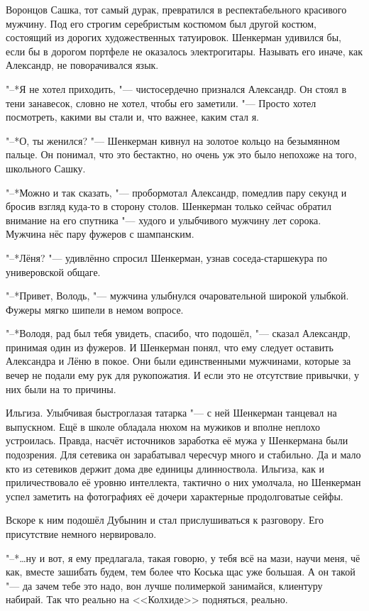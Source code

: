 Воронцов Сашка, тот самый дурак, превратился в респектабельного красивого мужчину.
Под его строгим серебристым костюмом был другой костюм, состоящий из дорогих художественных татуировок.
Шенкерман удивился бы, если бы в дорогом портфеле не оказалось электрогитары.
Называть его иначе, как Александр, не поворачивался язык.

"--*Я не хотел приходить, "--- чистосердечно признался Александр.
Он стоял в тени занавесок, словно не хотел, чтобы его заметили.
"--- Просто хотел посмотреть, какими вы стали и, что важнее, каким стал я.

"--*О, ты женился? "--- Шенкерман кивнул на золотое кольцо на безымянном пальце.
Он понимал, что это бестактно, но очень уж это было непохоже на того, школьного Сашку.

"--*Можно и так сказать, "--- пробормотал Александр, помедлив пару секунд и бросив взгляд куда-то в сторону столов.
Шенкерман только сейчас обратил внимание на его спутника "--- худого и улыбчивого мужчину лет сорока.
Мужчина нёс пару фужеров с шампанским.

"--*Лёня? "--- удивлённо спросил Шенкерман, узнав соседа-старшекура по универовской общаге.

"--*Привет, Володь, "--- мужчина улыбнулся очаровательной широкой улыбкой.
Фужеры мягко шипели в немом вопросе.

"--*Володя, рад был тебя увидеть, спасибо, что подошёл, "--- сказал Александр, принимая один из фужеров.
И Шенкерман понял, что ему следует оставить Александра и Лёню в покое.
Они были единственными мужчинами, которые за вечер не подали ему рук для рукопожатия.
И если это не отсутствие привычки, у них были на то причины.

Ильгиза.
Улыбчивая быстроглазая татарка "--- с ней Шенкерман танцевал на выпускном.
Ещё в школе обладала нюхом на мужиков и вполне неплохо устроилась.
Правда, насчёт источников заработка её мужа у Шенкермана были подозрения.
Для сетевика он зарабатывал чересчур много и стабильно.
Да и мало кто из сетевиков держит дома две единицы длинноствола.
Ильгиза, как и приличествовало её уровню интеллекта, тактично о них умолчала, но Шенкерман успел заметить на фотографиях её дочери характерные продолговатые сейфы.

Вскоре к ним подошёл Дубынин и стал прислушиваться к разговору.
Его присутствие немного нервировало.

"--*\ldots{}ну и вот, я ему предлагала, такая говорю, у тебя всё на мази, научи меня, чё как, вместе зашибать будем, тем более что Коська щас уже большая.
А он такой "--- да зачем тебе это надо, вон лучше полимеркой занимайся, клиентуру набирай.
Так что реально на <<Колхиде>> подняться, реально.


